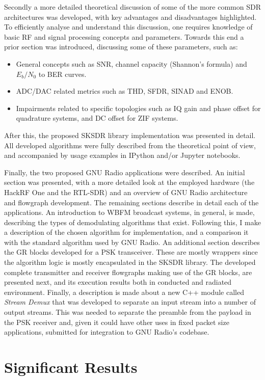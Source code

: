 Secondly a more detailed theoretical discussion of some of the more common SDR architectures was developed, with key advantages and disadvantages highlighted. To efficiently analyse and understand this discussion, one requires knowledge of basic RF and signal processing concepts and parameters. Towards this end a prior section was introduced, discussing some of these parameters, such as:
\begin{itemize}
  \item General concepts such as SNR, channel capacity (Shannon's formula) and $E_b/N_0$ to BER curves.
  \item ADC/DAC related metrics such as THD, SFDR, SINAD and ENOB.
  \item Impairments related to specific topologies such as IQ gain and phase offset for quadrature systems, and DC offset for ZIF systems.
\end{itemize}

After this, the proposed SKSDR library implementation was presented in detail. All developed algorithms were fully described from the theoretical point of view, and accompanied by usage examples in IPython and/or Jupyter notebooks.

Finally, the two proposed GNU Radio applications were described. An initial section was presented, with a more detailed look at the employed hardware (the HackRF One and the RTL-SDR) and an overview of GNU Radio architecture and flowgraph development. The remaining sections describe in detail each of the applications. An introduction to WBFM broadcast systems, in general, is made, describing the types of demodulating algorithms that exist. Following this, I make a description of the chosen algorithm for implementation, and a comparison it with the standard algorithm used by GNU Radio. An additional section describes the GR blocks developed for a PSK transceiver. These are mostly wrappers since the algorithm logic is mostly encapsulated in the SKSDR library. The developed complete transmitter and receiver flowgraphs making use of the GR blocks, are presented next, and its execution results both in conducted and radiated environment. Finally, a description is made about a new C++ module called \emph{Stream Demux} that was developed to separate an input stream into a number of output streams. This was needed to separate the preamble from the payload in the PSK receiver and, given it could have other uses in fixed packet size applications, submitted for integration to GNU Radio's codebase.

\section{Significant Results}
\label{sect:significant_results}

